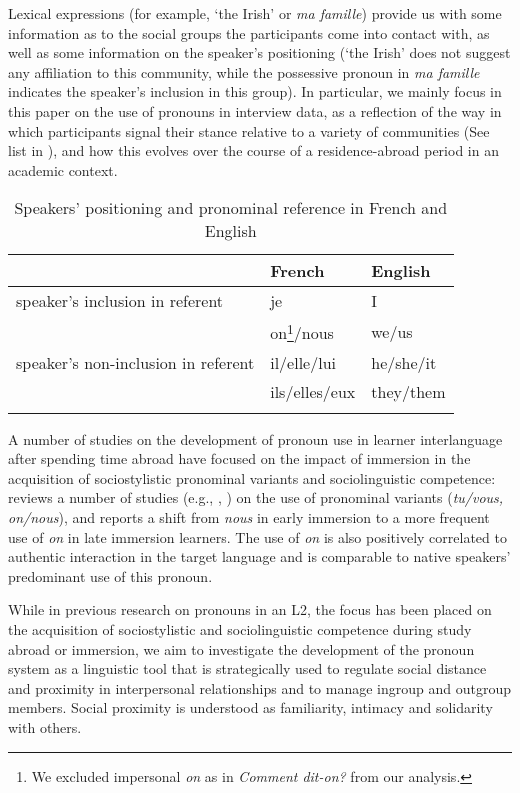 \documentclass[output=paper]{langscibook}
\begin{document}
Lexical expressions (for example, ‘the Irish’ or \textit{ma famille}) provide us with some information as to the social groups the participants come into contact with, as well as some information on the speaker’s positioning (‘the Irish’ does not suggest any affiliation to this community, while the possessive pronoun in \textit{ma famille} indicates the speaker’s inclusion in this group). In particular, we mainly focus in this paper on the use of pronouns in interview data, as a reflection of the way in which participants signal their stance relative to a variety of communities (See list in ), and how this evolves over the course of a residence-abroad period in an academic context.

\begin{table}
\begin{tabular}{lll}
\lsptoprule
        & French & English\\
\midrule
speaker’s inclusion in referent     & je & I\\
                                    & on\footnote{We excluded impersonal \textit{on} as in \textit{Comment dit-on?} from our analysis.}/nous & we/us\\
\midrule
speaker’s non-inclusion in referent & il/elle/lui & he/she/it\\
                                    & ils/elles/eux & they/them\\
\lspbottomrule
\end{tabular}
\caption{Speakers’ positioning and pronominal reference in French and English\label{tab:saddour:1}}
\end{table}

A number of studies on the development of pronoun use in learner interlanguage after spending time abroad have focused on the impact of immersion in the acquisition of sociostylistic pronominal variants and sociolinguistic competence: \citet{Dewaele2004} reviews a number of studies (e.g., \citealt{RehnerEtAl2003, Dewaele2002}, \citealt{Lemée2002}) on the use of pronominal variants (\textit{tu/vous, on/nous}), and reports a shift from \textit{nous} in early immersion to a more frequent use of \textit{on} in late immersion learners. The use of \textit{on} is also positively correlated to authentic interaction in the target language and is comparable to native speakers’ predominant use of this pronoun.

While in previous research on pronouns in an L2, the focus has been placed on the acquisition of sociostylistic and sociolinguistic competence during study abroad or immersion, we aim to investigate the development of the pronoun system as a linguistic tool that is strategically used to regulate social distance and proximity in interpersonal relationships and to manage ingroup and outgroup members. Social proximity is understood as familiarity, intimacy and solidarity with others.\largerpage[2]
\end{document}
